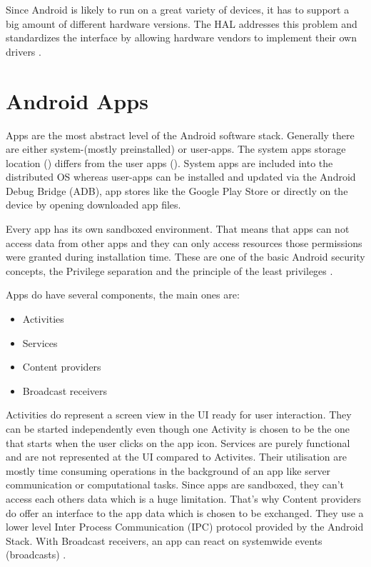 Since Android is likely to run on a great variety of devices,
it has to support a big amount of different hardware versions.
The HAL addresses this problem and
standardizes the interface by allowing hardware vendors
to implement their own drivers \parencite[p.18f]{levin}.

\section{Android Apps}\label{section:android_apps}
Apps are the most abstract level of the Android software stack.
Generally there are either system-(mostly preinstalled) or user-apps.
The system apps storage location () differs from
the user apps (). System apps are included into the
distributed OS whereas user-apps can be installed and updated
via the Android Debug Bridge (ADB), app stores
like the Google Play Store or directly on the device by opening
downloaded app files.

Every app has its own sandboxed environment. That means that
apps can not access data from other apps and they can only access
resources those permissions were granted during installation time.
These are one of the basic Android security concepts,
the Privilege separation and the principle of the least
privileges \parencite[ch.1]{securityinternals}.

Apps do have several components, the main ones are:

\begin{itemize}
\item Activities
\item Services
\item Content providers
\item Broadcast receivers
\end{itemize}

Activities do represent a screen view in the UI ready for user
interaction. They can be started independently even though one Activity
is chosen to be the one that starts when the user clicks on the
app icon. Services are purely functional and are not represented
at the UI compared to Activites. Their utilisation are mostly time
consuming operations in the background of an app like server
communication or computational tasks. Since apps are sandboxed,
they can't access each others data which is a huge limitation.
That's why Content providers do offer an interface to the app
data which is chosen to be exchanged.
They use a lower level Inter Process Communication (IPC) protocol
provided by the Android Stack.
With Broadcast receivers, an app can react on systemwide events
(broadcasts) \parencite[ch.1]{securityinternals}.

